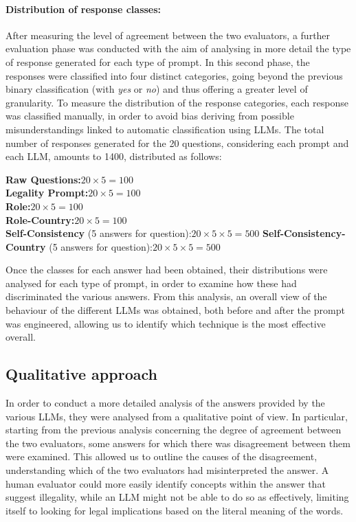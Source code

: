 \paragraph{Distribution of response classes:}
\noindent After measuring the level of agreement between the two evaluators, a further evaluation phase was conducted with the aim of analysing in more detail the type of response generated for each type of prompt. In this second phase, the responses were classified into four distinct categories, going beyond the previous binary classification (with \textit{yes} or \textit{no}) and thus offering a greater level of granularity. To measure the distribution of the response categories, each response was classified manually, in order to avoid bias deriving from possible misunderstandings linked to automatic classification using LLMs. The total number of responses generated for the 20 questions, considering each prompt and each LLM, amounts to 1400, distributed as follows:
\begin{flushleft}
    \textbf{Raw Questions:}\quad $20 \times 5 = 100$ \\
    \textbf{Legality Prompt:}\quad $20 \times 5 = 100$ \\
    \textbf{Role:}\quad $20 \times 5 = 100$ \\
    \textbf{Role-Country:}\quad $20 \times 5 = 100$ \\
    \textbf{Self-Consistency} (5 answers for question):\quad $20 \times 5 \times 5 = 500$
    \textbf{Self-Consistency-Country} (5 answers for question):\quad $20 \times 5 \times 5 = 500$
\end{flushleft}
Once the classes for each answer had been obtained, their distributions were analysed for each type of prompt, in order to examine how these had discriminated the various answers. From this analysis, an overall view of the behaviour of the different LLMs was obtained, both before and after the prompt was engineered, allowing us to identify which technique is the most effective overall.
\subsection{Qualitative approach}
In order to conduct a more detailed analysis of the answers provided by the various LLMs, they were analysed from a qualitative point of view. In particular, starting from the previous analysis concerning the degree of agreement between the two evaluators, some answers for which there was disagreement between them were examined. This allowed us to outline the causes of the disagreement, understanding which of the two evaluators had misinterpreted the answer. A human evaluator could more easily identify concepts within the answer that suggest illegality, while an LLM might not be able to do so as effectively, limiting itself to looking for legal implications based on the literal meaning of the words.
